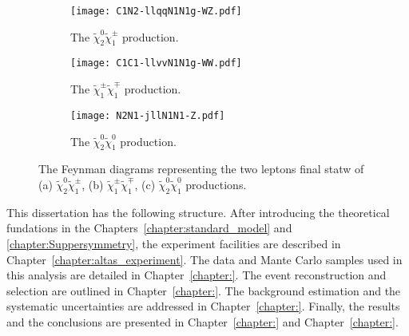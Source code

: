 \begin{figure}[htbp]
\begin{center}
\begin{subfigure}[b]{0.32\textwidth}
\begin{center}
\texttt{[image: C1N2-llqqN1N1g-WZ.pdf]}
\caption{The $\widetilde{\chi}^{0}_{2} \widetilde{\chi}^{\pm}_{1}$ production.}
\end{center}
\end{subfigure}%
\begin{subfigure}[b]{0.32\textwidth}
\begin{center}
\texttt{[image: C1C1-llvvN1N1g-WW.pdf]}
\caption{The $\widetilde{\chi}^{\pm}_{1} \widetilde{\chi}^{\mp}_{1}$ production.}
\end{center}
\end{subfigure}
\begin{subfigure}[b]{0.32\textwidth}
\begin{center}
\texttt{[image: N2N1-jllN1N1-Z.pdf]}
\caption{The $\widetilde{\chi}^{0}_{2} \widetilde{\chi}^{0}_{1}$ production.}
\end{center}
\end{subfigure}
\end{center}
\caption{The Feynman diagrams representing the two leptons final statw of (a) $\widetilde{\chi}^{0}_{2} \widetilde{\chi}^{\pm}_{1}$, (b) $\widetilde{\chi}^{\pm}_{1} \widetilde{\chi}^{\mp}_{1}$, (c) $\widetilde{\chi}^{0}_{2} \widetilde{\chi}^{0}_{1}$ productions.
}
\label{fig:intro_feynman_diagrams}
\end{figure}

This dissertation has the following structure.
After introducing the theoretical fundations in the Chapters~\ref{chapter:standard_model} and \ref{chapter:Suppersymmetry}, the experiment facilities are described in Chapter~\ref{chapter:altas_experiment}.
The data and Mante Carlo samples used in this analysis are detailed in Chapter~\ref{chapter:}.
The event reconstruction and selection are outlined in Chapter~\ref{chapter:}.
The background estimation and the systematic uncertainties are addressed in Chapter~\ref{chapter:}.
Finally, the results and the conclusions are presented in Chapter~\ref{chapter:} and Chapter~\ref{chapter:}.
